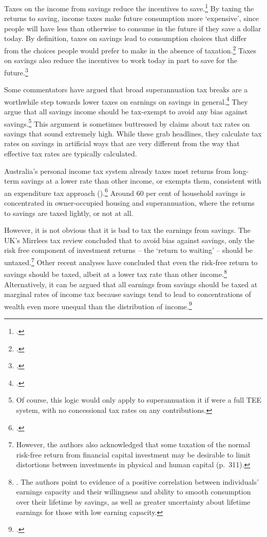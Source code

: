 \documentclass{grattanAlpha}
\begin{document}
Taxes on the income from savings reduce the incentives to save.\footcites[][32]{HenryTaxReview2010}[][58]{Treasury2015BudgetPapers201516}[][295]{MirrleesAdamBesleyEtAl2011}  By taxing the returns to saving, income taxes make future consumption more ‘expensive’, since people will have less than otherwise to consume in the future if they save a dollar today. By definition, taxes on savings lead to consumption choices that differ from the choices people would prefer to make in the absence of taxation.\footcite[][295]{MirrleesAdamBesleyEtAl2011} Taxes on savings also reduce the incentives to work today in part to save for the future.\footcite[][12]{HenryTaxReview2010}  


Some commentators have argued that broad superannuation tax breaks are a worthwhile step towards lower taxes on earnings on savings in general.\footcite{CarlingCowanErgas2015}  They argue that all savings income should be tax-exempt to avoid any bias against savings.\footnote{Of course, this logic would only apply to superannuation it if were a full TEE system, with no concessional tax rates on any contributions.} This argument is sometimes buttressed by claims about tax rates on savings that sound extremely high. While these grab headlines, they calculate tax rates on savings in artificial ways that are very different from the way that effective tax rates are typically calculated.  

Australia’s personal income tax system already taxes most returns from long-term savings at a lower rate than other income, or exempts them, consistent with an expenditure tax approach ().\footcite[][12]{HenryTaxReview2010}  Around 60 per cent of household savings is concentrated in owner-occupied housing and superannuation, where the returns to savings are taxed lightly, or not at all. 

However, it is not obvious that it is bad to tax the earnings from savings. The UK’s Mirrlees tax review concluded that to avoid bias against savings, only the risk free component of investment returns – the ‘return to waiting’ – should be untaxed.\footnote{\textcite[][284]{MirrleesAdamBesleyEtAl2011} However, the authors also acknowledged that some taxation of the normal risk-free return from financial capital investment may be desirable to limit distortions between investments in physical and human capital (p.~311).} 
Other recent analyses have concluded that even the risk-free return to savings should be taxed, albeit at a lower tax rate than other income.\footnote{\textcite{BanksDiamond2010}. The authors point to evidence of a positive correlation between individuals’ earnings capacity and their willingness and ability to smooth consumption over their lifetime by savings, as well as greater uncertainty about lifetime earnings for those with low earning capacity.}  Alternatively, it can be argued that all earnings from savings should be taxed at marginal rates of income tax because savings tend to lead to concentrations of wealth even more unequal than the distribution of income.\footcites{Leigh2013}{Piketty2013}[][23]{Ingles2015}
\end{document}
